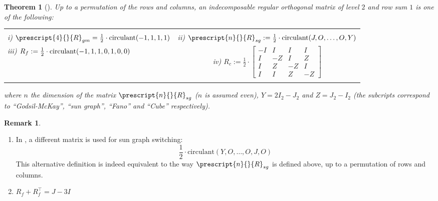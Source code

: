 \documentclass[12pt]{article}
\numberwithin{equation}{section}
\newtheorem{theorem}{Theorem}[section]
\theoremstyle{definition}
\newtheorem{remark}{Remark}
\newcommand{\ev}[1]{( #1 )}
\begin{document}

\begin{theorem}[\cite{wang_xu_2006}]
\label{def:all_switching_matrices}
Up to a permutation of the rows and columns, an indecomposable regular orthogonal matrix of level $2$ and row sum $1$ is one of the following: 

\begin{tabular}{ l c }
& \\[1em]
\textit{i)} $\prescript{4}{}{R}_{gm} = \frac{1}{2} \cdot \textup{circulant}(-1,1,1,1)$ & \textit{ii)} $\prescript{n}{}{R}_{sg} := \frac{1}{2} \cdot \textup{circulant}\ev{ J, O, \ldots, O, Y}$ \\[1.5em] 

\textit{iii)} $ R_{f} := \frac{1}{2} \cdot \textup{circulant}(-1,1,1,0,1,0,0) $ & \textit{iv)}  $ R_{c} := \frac{1}{2} \cdot 
\begin{bmatrix} 	
-I & I & I & I \\
I & -Z & I & Z \\
I & Z & -Z & I \\
I & I & Z & -Z 
\end{bmatrix} $  \\[1.5em] 
& \\
\end{tabular}

where $n$ the dimension of the matrix $\prescript{n}{}{R}_{sg} $ ($n$ is assumed even), $Y = 2I_2 - J_2$ and $Z = J_2 - I_2$ (the subcripts correspond to ``Godsil-McKay'', ``sun graph'', ``Fano'' and ``Cube'' respectively).
\end{theorem}

\begin{remark}
\begin{enumerate}
\item In \cite[Equation 7, p.~11]{mao_wang_liu_qiu_2023}, a different matrix is used for sun graph switching: 
$$
\frac{1}{2} \cdot \text{circulant}\ev{ Y, O, \ldots, O, J, O}
$$
This alternative definition is indeed equivalent to the way $\prescript{n}{}{R}_{sg}$ is defined above, up to a permutation of rows and columns. 

\item $R_{f} + R_{f}^{\top} = J - 3I$
\end{enumerate}


\end{remark}

\end{document}
